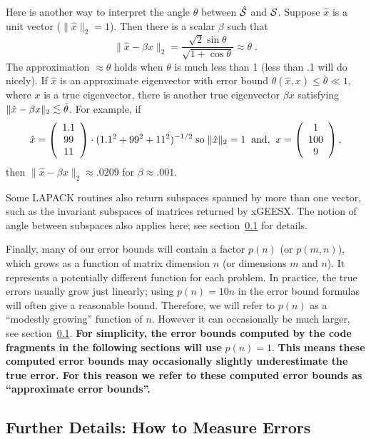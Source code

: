 Here is another way to interpret the angle $\theta$ between $\hat{\cal S}$ and
$\cal S$.
Suppose $\hat{x}$ is a unit vector ($\| \hat{x} \|_2 = 1$).
Then there is a scalar $\beta$ such that
\[
\| \hat{x} - \beta x \|_2 = \frac{\sqrt{2} \sin \theta}{\sqrt{1+ \cos \theta}} \approx \theta
\; .
\]
The approximation $\approx \theta$ holds when $\theta$ is much less than 1
(less than .1 will do nicely).  If $\hat{x}$ is an approximate
eigenvector with error bound $\theta ( \hat{x} , x ) \leq \bar{\theta} \ll 1$,
where $x$ is a true eigenvector, there is another true eigenvector
$\beta x$ satisfying $\| \hat{x} - \beta x \|_2 \leapproxeq \bar{\theta}$.
For example, if
\[
\hat{x} = \bmat{c} 1.1 \\ 99 \\ 11 \emat \cdot (1.1^2 + 99^2 + 11^2)^{-1/2}
\; {\rm so} \; \| \hat{x} \|_2 = 1
\; \; {\rm and,} \; \;
x = \bmat{c} 1 \\ 100 \\ 9 \emat,
\]
then $\| \hat{x} - \beta x \|_2 \approx .0209$ for $\beta \approx .001$.

Some LAPACK routines also return subspaces spanned by more than one
vector, such as the invariant subspaces of matrices returned by xGEESX.
The notion of angle between subspaces also applies here;
see section~\ref{secbackgroundnormnotation} for details.

Finally, many of our error bounds will contain a factor $p(n)$ (or $p(m,n)$),
which grows as a function of matrix dimension $n$ (or dimensions $m$ and $n$).
It represents a potentially different function for each problem.
In practice, the true errors usually grow just linearly; using
$p(n)=10n$ in the error bound formulas will often give a reasonable bound.
Therefore, we will refer to $p(n)$ as a ``modestly growing'' function of $n$.
However it can occasionally be much larger, see
section~\ref{secbackgroundnormnotation}.
{\bf For simplicity, the error bounds computed by the code fragments
in the following sections will use} $p(n)=1$.
{\bf This means these computed error bounds may occasionally
slightly underestimate the true error. For this reason we refer
to these computed error bounds as ``approximate error bounds''.}

\subsection{Further Details:  How to Measure Errors}\label{secbackgroundnormnotation}

